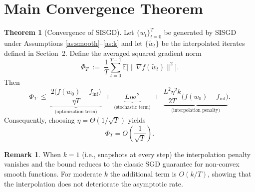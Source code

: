 \documentclass{article}
\newcommand{\E}{\mathbb{E}}
\theoremstyle{definition}
\newtheorem{theorem}{Theorem}
\newtheorem{remark}{Remark}
\begin{document}
\section*{Main Convergence Theorem}
\begin{theorem}[Convergence of SISGD]\label{thm:main}
Let $\{w_t\}_{t=0}^{T}$ be generated by SISGD under Assumptions
\ref{as:smooth}–\ref{as:k} and let $\{\tilde w_t\}$ be the interpolated iterates
defined in Section~2.  Define the averaged squared gradient norm
\[
\Phi_T\;:=\;\frac{1}{T}\sum_{t=0}^{T-1}
\E\big[\|\nabla f(\tilde w_t)\|^{2}\big].
\]
Then
\[
\Phi_T\;\le\;
\underbrace{\frac{2\big(f(w_0)-f_{\inf}\big)}{\eta T}}_{\displaystyle
\text{(optimization term)}}
\;+\;
\underbrace{L\eta\sigma^{2}}_{\displaystyle\text{(stochastic term)}}
\;+\;
\underbrace{\frac{L^{2}\eta^{2}k}{2T}\big(f(w_0)-f_{\inf}\big)}_{\displaystyle
\text{(interpolation penalty)}}.
\tag{T1}
\]
Consequently, choosing $\eta=\Theta(1/\sqrt{T})$ yields
\[
\Phi_T = O\!\left(\frac{1}{\sqrt{T}}\right) .
\]
\end{theorem}

\begin{remark}
When $k=1$ (i.e., snapshots at every step) the interpolation penalty vanishes
and the bound reduces to the classic SGD guarantee for non‑convex smooth
functions.  For moderate $k$ the additional term is $O(k/T)$, showing that
the interpolation does not deteriorate the asymptotic rate.
\end{remark}

\end{document}
